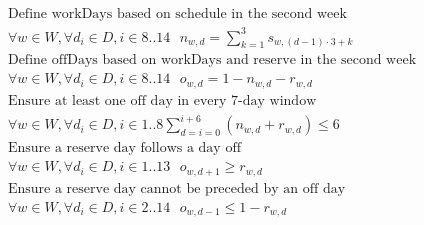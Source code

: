 \documentclass{article}
\begin{document}
\begin{gather*}
\text{Define workDays based on schedule in the second week} \\
\forall w \in W, \forall d_i \in D, i \in {8..14} \text{ } n_{w, d} = \sum_{k=1}^{3} s_{w, (d-1) \cdot 3 + k} \\
\text{Define offDays based on workDays and reserve in the second week} \\
\forall w \in W, \forall d_i \in D, i \in {8..14} \text{ } o_{w, d} = 1 - n_{w, d} - r_{w, d} \\
\text{Ensure at least one off day in every 7-day window} \\
\forall w \in W, \forall d_i \in D, i \in {1..8} \sum_{d = i = 0}^{i+6} (n_{w, d} + r_{w, d}) \leq 6 \\
\text{Ensure a reserve day follows a day off} \\
\forall w \in W, \forall d_i \in D, i \in {1..13} \text{ } o_{w, d + 1} \geq r_{w, d} \\
\text{Ensure a reserve day cannot be preceded by an off day} \\
\forall w \in W, \forall d_i \in D, i \in {2..14} \text{ } o_{w, d - 1} \leq 1 - r_{w, d} 
\end{gather*}
\end{document}
